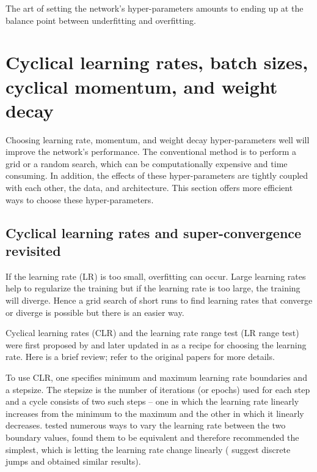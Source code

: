 \documentclass{article} %
\begin{document}
The art of setting the network's hyper-parameters amounts to ending up at the balance point between underfitting and overfitting.




\section{Cyclical learning rates, batch sizes, cyclical momentum, and weight decay}
\label{sec:cyclicalMomentum}

Choosing learning rate, momentum, and weight decay hyper-parameters well will improve the network's performance.  The conventional method is to perform a grid or a random search, which can be computationally expensive and time consuming. In addition, the effects of these hyper-parameters are tightly coupled with each other, the data, and architecture. This section offers more efficient ways to choose these hyper-parameters.



\subsection{Cyclical learning rates and super-convergence revisited}
\label{sec:CLR}

If the learning rate (LR) is too small, overfitting can occur.  Large learning rates help to regularize the training but if the learning rate is too large, the training will diverge.  Hence a grid search of short runs to find learning rates that converge or diverge is possible but there is an easier way.

Cyclical learning rates (CLR) and the learning rate range test (LR range test) were first proposed by \cite{smith2015no} and later updated in \cite{smith2017cyclical} as a recipe for choosing the learning rate.  Here is a brief review; refer to the  original papers for more details.

To use CLR, one specifies minimum and maximum learning rate boundaries and a stepsize.  The stepsize is the number of iterations (or epochs) used for each step and a cycle consists of two such steps -- one in which the learning rate linearly increases from the minimum to the maximum and the other in which it linearly decreases.  \cite{smith2015no} tested numerous ways to vary the learning rate between the two boundary values, found them to be equivalent  and therefore recommended the simplest, which is letting the learning rate change linearly (\cite{jastrzkebski2017three} suggest discrete jumps and obtained similar results).  
\end{document}
